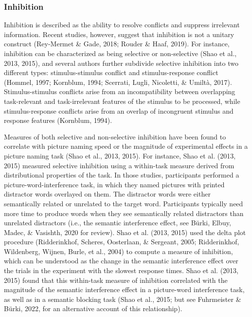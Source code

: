 \documentclass[
  man,floatsintext]{apa6}
\begin{document}
\hypertarget{inhibition}{%
\subsubsection{Inhibition}\label{inhibition}}

Inhibition is described as the ability to resolve conflicts and suppress irrelevant information. Recent studies, however, suggest that inhibition is not a unitary construct (Rey-Mermet \& Gade, 2018; Rouder \& Haaf, 2019). For instance, inhibition can be characterized as being selective or non-selective (Shao et al., 2013, 2015), and several authors further subdivide selective inhibition into two different types: stimulus-stimulus conflict and stimulus-response conflict (Hommel, 1997; Kornblum, 1994; Scerrati, Lugli, Nicoletti, \& Umiltà, 2017). Stimulus-stimulus conflicts arise from an incompatibility between overlapping task-relevant and task-irrelevant features of the stimulus to be processed, while stimulus-response conflicts arise from an overlap of incongruent stimulus and response features (Kornblum, 1994).

Measures of both selective and non-selective inhibition have been found to correlate with picture naming speed or the magnitude of experimental effects in a picture naming task (Shao et al., 2013, 2015). For instance, Shao et al. (2013, 2015) measured selective inhibition using a within-task measure derived from distributional properties of the task. In those studies, participants performed a picture-word-interference task, in which they named pictures with printed distractor words overlayed on them. The distractor words were either semantically related or unrelated to the target word. Participants typically need more time to produce words when they see semantically related distractors than unrelated distractors (i.e., the semantic interference effect, see Bürki, Elbuy, Madec, \& Vasishth, 2020 for review). Shao et al. (2013, 2015) used the delta plot procedure (Ridderinkhof, Scheres, Oosterlaan, \& Sergeant, 2005; Ridderinkhof, Wildenberg, Wijnen, Burle, et al., 2004) to compute a measure of inhibition, which can be understood as the change in the semantic interference effect over the trials in the experiment with the slowest response times. Shao et al. (2013, 2015) found that this within-task measure of inhibition correlated with the magnitude of the semantic interference effect in a picture-word interference task, as well as in a semantic blocking task (Shao et al., 2015; but see Fuhrmeister \& Bürki, 2022, for an alternative account of this relationship).
\end{document}
